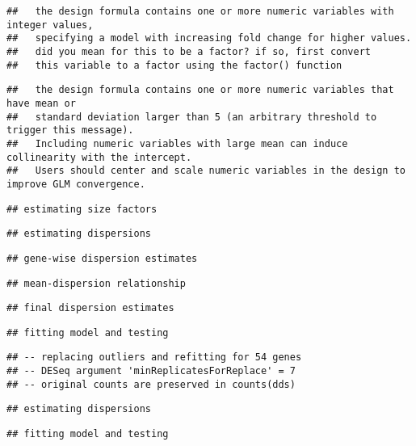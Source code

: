 \documentclass[
]{article}
\begin{document}
\begin{verbatim}
##   the design formula contains one or more numeric variables with integer values,
##   specifying a model with increasing fold change for higher values.
##   did you mean for this to be a factor? if so, first convert
##   this variable to a factor using the factor() function
\end{verbatim}

\begin{verbatim}
##   the design formula contains one or more numeric variables that have mean or
##   standard deviation larger than 5 (an arbitrary threshold to trigger this message).
##   Including numeric variables with large mean can induce collinearity with the intercept.
##   Users should center and scale numeric variables in the design to improve GLM convergence.
\end{verbatim}

\begin{verbatim}
## estimating size factors
\end{verbatim}

\begin{verbatim}
## estimating dispersions
\end{verbatim}

\begin{verbatim}
## gene-wise dispersion estimates
\end{verbatim}

\begin{verbatim}
## mean-dispersion relationship
\end{verbatim}

\begin{verbatim}
## final dispersion estimates
\end{verbatim}

\begin{verbatim}
## fitting model and testing
\end{verbatim}

\begin{verbatim}
## -- replacing outliers and refitting for 54 genes
## -- DESeq argument 'minReplicatesForReplace' = 7 
## -- original counts are preserved in counts(dds)
\end{verbatim}

\begin{verbatim}
## estimating dispersions
\end{verbatim}

\begin{verbatim}
## fitting model and testing
\end{verbatim}
\end{document}
